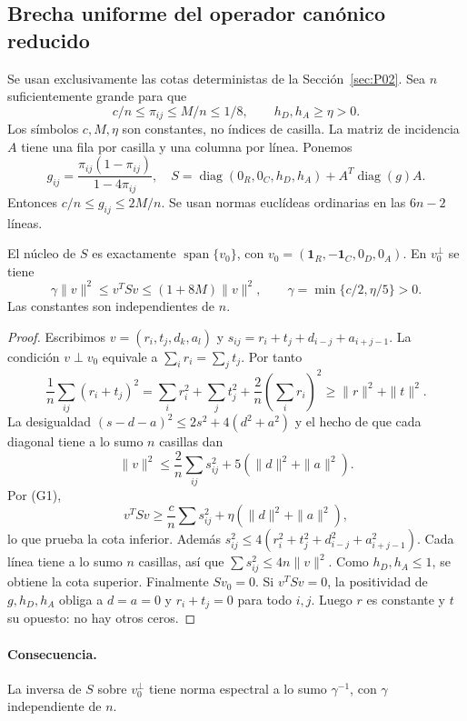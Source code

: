 \subsection{Brecha uniforme del operador canónico reducido}\label{sec:P03}
Se usan exclusivamente las cotas deterministas de la Sección~\ref{sec:P02}.
Sea $n$ suficientemente grande para que
\[
 c/n\le\pi_{ij}\le M/n\le1/8,\qquad h_D,h_A\ge\eta>0.
\]
Los símbolos $c,M,\eta$ son constantes, no índices de casilla.
La matriz de incidencia $A$ tiene una fila por casilla y una columna por línea.
Ponemos
\[
 g_{ij}=\frac{\pi_{ij}(1-\pi_{ij})}{1-4\pi_{ij}},\quad
 S=\operatorname{diag}(0_R,0_C,h_D,h_A)+A^T\operatorname{diag}(g)A.
                                                        \tag{G1}
\]
Entonces $c/n\le g_{ij}\le2M/n$.
Se usan normas euclídeas ordinarias en las $6n-2$ líneas.

\begin{proposicion}
El núcleo de $S$ es exactamente
$\operatorname{span}\{v_0\}$, con
$v_0=(\mathbf1_R,-\mathbf1_C,0_D,0_A)$.
En $v_0^\perp$ se tiene
\[
 \gamma\|v\|^2\le v^TSv\le(1+8M)\|v\|^2,
 \qquad \gamma=\min\{c/2,\eta/5\}>0.               \tag{G2}
\]
Las constantes son independientes de $n$.
\end{proposicion}
\begin{proof}
Escribimos $v=(r_i,t_j,d_k,a_l)$ y
$s_{ij}=r_i+t_j+d_{i-j}+a_{i+j-1}$.
La condición $v\perp v_0$ equivale a $\sum_i r_i=\sum_jt_j$.
Por tanto
\[
 \frac1n\sum_{ij}(r_i+t_j)^2
 =\sum_i r_i^2+\sum_jt_j^2+
       \frac2n\left(\sum_i r_i\right)^2
 \ge\|r\|^2+\|t\|^2.
\]
La desigualdad $(s-d-a)^2\le2s^2+4(d^2+a^2)$
y el hecho de que cada diagonal tiene a lo sumo $n$ casillas
dan
\[
 \|v\|^2\le\frac2n\sum_{ij}s_{ij}^2
                        +5(\|d\|^2+\|a\|^2).     \tag{G3}
\]
Por (G1),
\[
 v^TSv\ge\frac cn\sum s_{ij}^2+
                          \eta(\|d\|^2+\|a\|^2),
\]
lo que prueba la cota inferior. Además
$s_{ij}^2\le4(r_i^2+t_j^2+d_{i-j}^2+a_{i+j-1}^2)$.
Cada línea tiene a lo sumo $n$ casillas, así que
$\sum s_{ij}^2\le4n\|v\|^2$. Como $h_D,h_A\le1$,
se obtiene la cota superior.
Finalmente $Sv_0=0$. Si $v^TSv=0$, la positividad de
$g,h_D,h_A$ obliga a $d=a=0$ y $r_i+t_j=0$ para todo $i,j$.
Luego $r$ es constante y $t$ su opuesto: no hay otros ceros.
\end{proof}

\paragraph{Consecuencia.}
La inversa de $S$ sobre $v_0^\perp$ tiene norma espectral
a lo sumo $\gamma^{-1}$, con $\gamma$ independiente de $n$.
